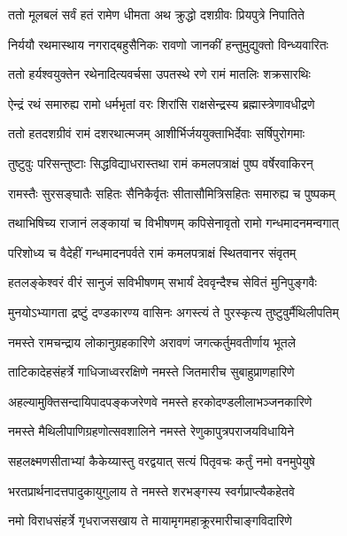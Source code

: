 \twolineshloka
{ततो मूलबलं सर्वं हतं रामेण धीमता}
{अथ क्रुद्धो दशग्रीवः प्रियपुत्रे निपातिते}%

\twolineshloka
{निर्ययौ रथमास्थाय नगराद्बहुसैनिकः}
{रावणो जानकीं हन्तुमुद्युक्तो विन्ध्यवारितः}%

\twolineshloka
{ततो हर्यश्वयुक्तेन रथेनादित्यवर्चसा}
{उपतस्थे रणे रामं मातलिः शक्रसारथिः}%

\twolineshloka
{ऐन्द्रं रथं समारुह्य रामो धर्मभृतां वरः}
{शिरांसि राक्षसेन्द्रस्य ब्रह्मास्त्रेणावधीद्रणे}%

\twolineshloka
{ततो हतदशग्रीवं रामं दशरथात्मजम्}
{आशीर्भिर्जययुक्ताभिर्देवाः सर्षिपुरोगमाः}%

\twolineshloka
{तुष्टुवुः परिसन्तुष्टाः सिद्धविद्याधरास्तथा}
{रामं कमलपत्राक्षं पुष्प वर्षेरवाकिरन्}%

\twolineshloka
{रामस्तैः सुरसङ्घातैः सहितः सैनिकैर्वृतः}
{सीतासौमित्रिसहितः समारुह्य च पुष्पकम्}%

\twolineshloka
{तथाभिषिच्य राजानं लङ्कायां च विभीषणम्}
{कपिसेनावृतो रामो गन्धमादनमन्वगात्}%

\twolineshloka
{परिशोध्य च वैदेहीं गन्धमादनपर्वते}
{रामं कमलपत्राक्षं स्थितवानर संवृतम्}%

\twolineshloka
{हतलङ्केश्वरं वीरं सानुजं सविभीषणम्}
{सभार्यं देववृन्दैश्च सेवितं मुनिपुङ्गवैः}%

\twolineshloka
{मुनयोऽभ्यागता द्रष्टुं दण्डकारण्य वासिनः}
{अगस्त्यं ते पुरस्कृत्य तुष्टुवुर्मैथिलीपतिम्}%


\twolineshloka
{नमस्ते रामचन्द्राय लोकानुग्रहकारिणे}
{अरावणं जगत्कर्तुमवतीर्णाय भूतले}%

\twolineshloka
{ताटिकादेहसंहर्त्रे गाधिजाध्वररक्षिणे}
{नमस्ते जितमारीच सुबाहुप्राणहारिणे}%

\twolineshloka
{अहल्यामुक्तिसन्दायिपादपङ्कजरेणवे}
{नमस्ते हरकोदण्डलीलाभञ्जनकारिणे}%

\twolineshloka
{नमस्ते मैथिलीपाणिग्रहणोत्सवशालिने}
{नमस्ते रेणुकापुत्रपराजयविधायिने}%

\twolineshloka
{सहलक्ष्मणसीताभ्यां कैकेय्यास्तु वरद्वयात्}
{सत्यं पितृवचः कर्तुं नमो वनमुपेयुषे}%

\twolineshloka
{भरतप्रार्थनादत्तपादुकायुगुलाय ते}
{नमस्ते शरभङ्गस्य स्वर्गप्राप्त्यैकहेतवे}%

\twolineshloka
{नमो विराधसंहर्त्रे गृधराजसखाय ते}
{मायामृगमहाक्रूरमारीचाङ्गविदारिणे}%

